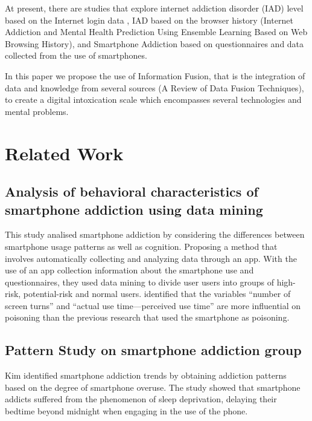 \documentclass[conference]{IEEEtran}
\begin{document}
At present, there are studies that explore internet
addiction disorder (IAD) level based on the Internet login data \cite{b7}, IAD based on the browser history (Internet Addiction and Mental Health Prediction Using Ensemble Learning Based on Web Browsing History), and Smartphone Addiction based on questionnaires and data collected from the use of smartphones.

In this paper we propose the use of Information Fusion, that is the integration of data and knowledge from several sources (A Review of Data Fusion Techniques), to create a digital intoxication scale which encompasses several technologies and mental problems.

\section{Related Work}

\subsection{Analysis of behavioral characteristics of smartphone addiction using data mining}

This study analised smartphone addiction by considering the differences between smartphone usage patterns as well as cognition. Proposing a method that involves automatically collecting and analyzing data through an app. With the use of an app collection information about the smartphone use and questionnaires, they used data mining to divide user users into groups of high-risk, potential-risk and normal users. \cite{b7} identified that the variables “number of screen turns” and “actual use time—perceived use time” are more influential on poisoning than the previous research that used the smartphone as poisoning.

\subsection{Pattern Study on smartphone addiction group}

Kim \cite{b9} identified smartphone addiction trends by obtaining addiction patterns based on the degree of smartphone overuse. The study showed that smartphone addicts suffered from the phenomenon of sleep deprivation, delaying their bedtime beyond midnight when engaging in the use of the phone.
\end{document}
